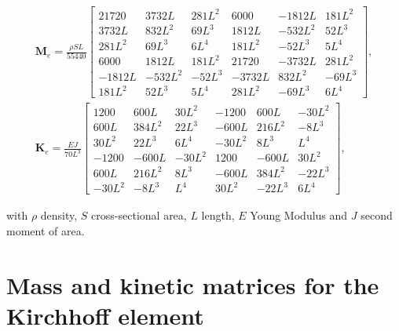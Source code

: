 \begin{align}
	\mathbf{M}_e = \frac{\rho S L}{55440}\begin{bmatrix}21720 & 3732L & 281L^2 & 6000 & -1812L & 181L^2 \\ 
																							3732L & 832L^2 & 69L^3 & 1812L & -532L^2 & 52L^3 \\
																							281L^2 & 69L^3 & 6L^4 & 181L^2 & -52L^3 & 5L^4  \\
																							6000 & 1812L & 181L^2 & 21720 & -3732L & 281L^2\\
																							-1812L & -532L^2 & -52L^3 & -3732L & 832L^2 & -69L^3 \\
																							181L^2 & 52L^3 & 5L^4 & 281L^2 & -69L^3 & 6L^4\end{bmatrix},\\ 
																			 \mathbf{K}_e = \frac{E J}{70L^3}\begin{bmatrix}1200 & 600L & 30L^2 & -1200 & 600L & -30L^2\\ 
																																							600L & 384L^2 & 22L^3 & -600L & 216L^2 & -8L^3 \\
																																							30L^2 & 22L^3 & 6L^4 & -30L^2 & 8L^3 & L^4\\
																																							-1200 & -600L & -30L^2 & 1200 & -600L & 30L^2 \\
																																							600L & 216L^2 & 8L^3 & -600L & 384L^2 & -22L^3\\
																																							-30L^2 & -8L^3 & L^4 & 30L^2 & -22L^3 & 6L^4\end{bmatrix},
\end{align}
 
with $\rho$ density, $S$ cross-sectional area, $L$ length, $E$ Young Modulus and $J$ second moment of area.

\newpage

\section[Kirchhoff Element]{Mass and kinetic matrices for the Kirchhoff element}
\label{chap:appendix4}

